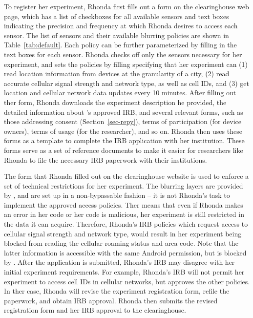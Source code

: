 To register her experiment, Rhonda first fills out a form on the clearinghouse 
web page, which has a list of checkboxes for all available sensors 
and text boxes indicating the precision and frequency at which Rhonda 
desires to access each sensor. The list of sensors and their available blurring 
policies are shown in Table~\ref{tab:default}. Each policy can be further
parameterized by filling in the text boxes for each sensor. 
Rhonda checks off only the sensors necessary for her experiment, 
and sets the policies by filling specifying that 
her experiment can (1) read location information
from devices at the granularity of a city, (2) read accurate
cellular signal strength and network type, as well as
cell IDs, and (3) get location and
cellular network data updates every 10 minutes. 
After filling out ther form, Rhonda downloads the experiment description 
he provided, the detailed information about \sysname's approved IRB, 
and several relevant forms, such as those addressing consent 
(Section~\ref{sec-repy}), terms of participation (for device owners),  
terms of usage (for the researcher), and so on.  
Rhonda then uses these forms as a template to complete the IRB application 
with her institution. These forms serve as a set of reference documents 
to make it easier for researchers like Rhonda to 
file the necessary IRB paperwork with their institutions.

The form that Rhonda filled out on the clearinghouse website is used to
enforce a set of technical restrictions for her experiment. 
The blurring layers are provided by 
\sysname, and are set up in a non-bypassable fashion -- it is not 
Rhonda's task to implement the approved access policies. Ther means
that even if Rhonda makes an error in her code or her code is malicious, her 
experiment is still restricted in the data it can acquire. 
Therefore, Rhonda's IRB 
policies which request access to cellular signal strength and network type, would result 
in her experiment being blocked from reading the cellular roaming status and area 
code. Note that the latter information is accessible with the same 
Android permission, but is blocked by \sysname. 
After the application is submitted, Rhonda's IRB may disagree with 
her initial experiment requirements. For example, Rhonda's IRB will not permit
her experiment to access cell IDs in cellular networks, but 
approves the other policies. 
In ther case, Rhonda will revise the experiment registration form, refile the paperwork, 
and obtain IRB approval. Rhonda then submits the revised  
registration form and her IRB approval to the clearinghouse.


